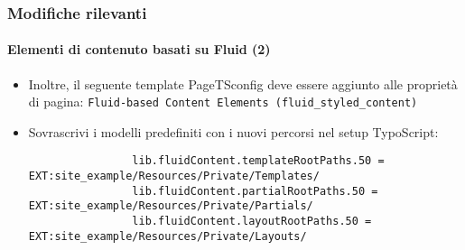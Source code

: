 \begin{frame}[fragile]
	\frametitle{Modifiche rilevanti}
	\framesubtitle{Elementi di contenuto basati su Fluid (2)}

	\lstset{basicstyle=\tiny\ttfamily}

	\begin{itemize}

		\item Inoltre, il seguente template PageTSconfig deve essere aggiunto alle proprietà di pagina:\newline
			\small
				\texttt{Fluid-based Content Elements (fluid\_styled\_content)}
			\normalsize

		\item Sovrascrivi i modelli predefiniti con i nuovi percorsi nel setup TypoScript:

			\begin{lstlisting}
				lib.fluidContent.templateRootPaths.50 = EXT:site_example/Resources/Private/Templates/
				lib.fluidContent.partialRootPaths.50 = EXT:site_example/Resources/Private/Partials/
				lib.fluidContent.layoutRootPaths.50 = EXT:site_example/Resources/Private/Layouts/
			\end{lstlisting}

	\end{itemize}

\end{frame}


